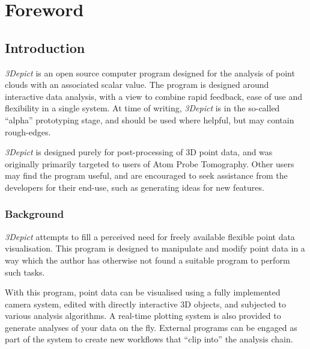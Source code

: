 \documentclass[10pt]{article}
\begin{document}
\section{Foreword}
\subsection{Introduction}

\emph{3Depict} is an open source computer program designed for the analysis of point clouds with an associated scalar value. The program is designed around interactive data analysis, with a view to combine rapid feedback, ease of use and flexibility in a single system.  At time of writing, \emph{3Depict} is in the so-called ``alpha'' prototyping stage, and should be used where helpful, but may contain rough-edges.

\emph{3Depict} is designed purely for post-processing of 3D point data, and was originally primarily targeted to users of Atom Probe Tomography. Other users may find the program useful, and are encouraged to seek assistance from the developers for their end-use, such as generating ideas for new features. 
 
\subsubsection{Background}

\emph{3Depict} attempts to fill a perceived need for freely available flexible point data visualisation. This program is designed to manipulate and modify point data in a way which the author has otherwise not found a suitable program to perform such tasks.  
 
With this program, point data can be visualised using a fully implemented camera system, edited with directly interactive 3D objects, and subjected to various analysis algorithms. A real-time plotting system is also provided to generate analyses of your data on the fly. External programs can be engaged as part of the system to create new workflows that ``clip into'' the analysis chain. 
 
\end{document}
